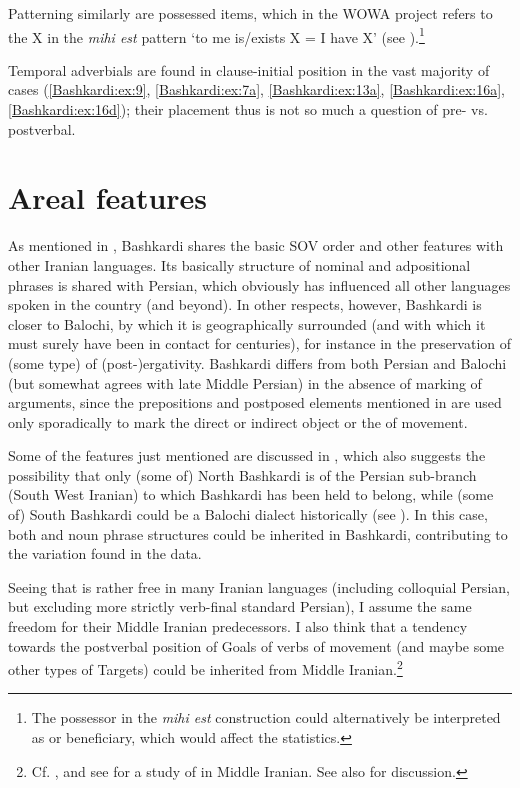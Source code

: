 \documentclass[output=paper,colorlinks,citecolor=brown]{langscibook}
\begin{document}
Patterning similarly are possessed items, which in the WOWA project refers to the X in the \textit{mihi est} pattern `to me is/exists X = I have X' (see ).\footnote{
The possessor in the \textit{mihi est} construction could alternatively be interpreted as  or beneficiary, which would affect the statistics. 
}

Temporal adverbials are found in clause-initial position in the vast majority of cases (\ref{Bashkardi:ex:9}, \ref{Bashkardi:ex:7a}, \ref{Bashkardi:ex:13a}, \ref{Bashkardi:ex:16a}, \ref{Bashkardi:ex:16d}); their placement thus is not so much a question of pre- vs. postverbal. 

\section{Areal features}\label{Bashkardi:ss:3}

As mentioned in , Bashkardi shares the basic SOV order and other features with other Iranian languages. Its basically  structure of nominal and adpositional phrases is shared with Persian, which obviously has influenced all other languages spoken in the country (and beyond). In other respects, however, Bashkardi is closer to Balochi, by which it is geographically surrounded (and with which it must surely have been in contact for centuries), for instance in the preservation of (some type) of (post-)ergativity. Bashkardi differs from both Persian and Balochi (but somewhat agrees with late Middle Persian) in the absence of marking of arguments, since the prepositions and postposed elements mentioned in  are used only sporadically to mark the direct or indirect object or the  of movement.

Some of the features just mentioned are discussed in \citet{korn2022areal}, which also suggests the possibility that only (some of) North Bashkardi is of the Persian sub-branch (South West Iranian) to which Bashkardi has been held to belong, while (some of) South Bashkardi could be a Balochi dialect historically (see ). In this case, both  and  noun phrase structures could be inherited in Bashkardi, contributing to the variation found in the data.

Seeing that  is rather free in many Iranian languages (including colloquial Persian, but excluding more strictly verb-final standard Persian), I assume the same freedom for their Middle Iranian predecessors. I also think that a tendency towards the postverbal position of Goals of verbs of movement (and maybe some other types of Targets) could be inherited from Middle Iranian.\footnote{
Cf. \citet[122]{Korn2022Targets}, and see \citet{jugel_word_2022} for a study of  in Middle Iranian. See also  for discussion.}
\end{document}
